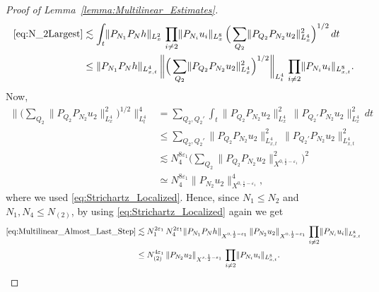 \documentclass[10pt,a4paper]{amsart}
\begin{document}
\begin{proof}[Proof of Lemma~\ref{lemma:Multilinear_Estimates}]
\begin{align}
        \eqref{eq:N_2Largest} 
        & \lesssim 
        \int_t \lVert P_{N_1}P_N h \rVert_{L_x^2} \, 
        \prod_{i \neq 2} \lVert P_{N_i} u_i \rVert_{L_x^8} \, 
        \Big( \sum_{Q_2}
        \lVert P_{Q_2} P_{N_2} u_2 \rVert_{L_x^4}^2 \Big)^{1/2} \, dt \nonumber \\
        & \leq 
        \lVert P_{N_1}P_N h \rVert_{L_{x,t}^4} \, 
        \bigg\lVert \Big( \sum_{Q_2}
        \lVert P_{Q_2} P_{N_2} u_2 \rVert_{L_x^4}^2 \Big)^{1/2} \bigg\rVert_{L_t^4} \, 
        \prod_{i \neq 2} \lVert P_{N_i} u_i \rVert_{L_{x,t}^8}.
    \end{align}
    Now, 
    \begin{align}
        \bigg\lVert \Big( \sum_{Q_2}
        \lVert P_{Q_2} P_{N_2} u_2 \rVert_{L_x^4}^2 \Big)^{1/2} \bigg\rVert_{L_t^4}^4
        & = \sum_{Q_2, Q_2'} 
        \int_t 
        \lVert P_{Q_2} P_{N_2} u_2 \rVert_{L_x^4}^2 \,
        \lVert P_{Q_2'} P_{N_2} u_2 \rVert_{L_x^4}^2 \, dt \\
        & \leq \sum_{Q_2, Q_2'}
        \lVert P_{Q_2} P_{N_2} u_2 \rVert_{L_{x,t}^4}^2 \, 
        \lVert P_{Q_2'} P_{N_2} u_2 \rVert_{L_{x,t}^4}^2 \\
        & \lesssim N_4^{8\varepsilon_1} 
        \Big( \sum_{Q_2}
        \lVert P_{Q_2} P_{N_2} u_2 \rVert_{X^{0,\frac{1}{2}-\varepsilon_1}}^2 
        \Big)^2 \\
        & \simeq 
        N_4^{8\varepsilon_1}  
        \lVert P_{N_2} u_2 \rVert_{X^{0,\frac{1}{2}-\varepsilon_1}}^4, 
    \end{align}
    where we used \eqref{eq:Strichartz_Localized}. Hence, since $N_1 \leq N_2$ and $N_1, N_4 \leq N_{(2)}$, by using \eqref{eq:Strichartz_Localized} again we get
    \begin{align}
        \eqref{eq:Multilinear_Almost_Last_Step}
        & \lesssim 
        N_1^{2\varepsilon_1} \, N_4^{2\varepsilon_1} 
        \lVert P_{N_1}P_N h \rVert_{X^{0,\frac{1}{2}-\varepsilon_1}} \, 
        \lVert P_{N_2} u_2 \rVert_{X^{0,\frac{1}{2}-\varepsilon_1}}\, 
        \prod_{i \neq 2} \lVert P_{N_i} u_i \rVert_{L_{x,t}^8} \\
        & \leq 
        N_{(2)}^{4\varepsilon_1} \, 
        \lVert P_{N_2} u_2 \rVert_{X^{s,\frac{1}{2}-\varepsilon_1}}\, 
        \prod_{i \neq 2} \lVert P_{N_i} u_i \rVert_{L_{x,t}^8}.\qedhere
    \end{align}
\end{proof}
\end{document}
